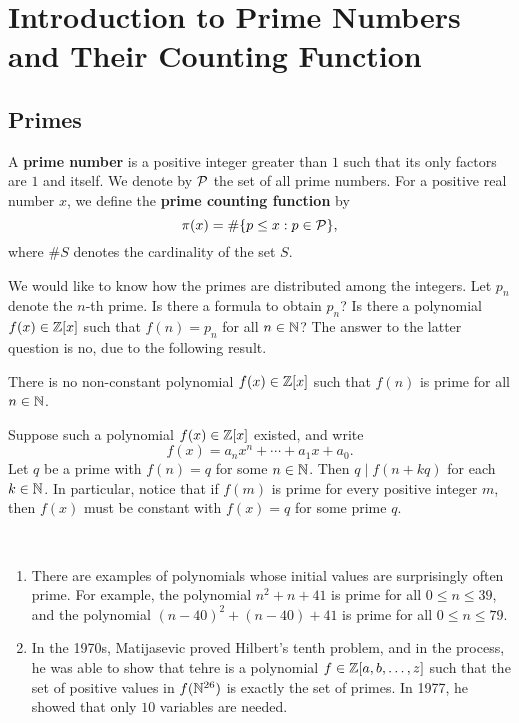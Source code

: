 \section{Introduction to Prime Numbers and Their Counting Function}\label{sec:1}

\subsection{Primes}\label{subsec:1.1}

\begin{defn}\label{def:1.1}
A {\bf prime number} is a positive integer greater than $1$ such that its only factors are $1$ and 
itself. We denote by ${\cal P}$ the set of all prime numbers. For a positive real number $x$, 
we define the {\bf prime counting function} by 
\[ \pi(x) = \#\{p \leq x : p \in {\cal P}\}, \]
where $\#S$ denotes the cardinality of the set $S$. 
\end{defn}

We would like to know how the primes are distributed among the integers. Let $p_n$ denote the 
$n$-th prime. Is there a formula to obtain $p_n$? Is there a polynomial $f(x) \in \mathbb{Z}[x]$ such that 
$f(n) = p_n$ for all $n \in \mathbb{N}$? The answer to the latter question is no, due to the following result. 

\begin{prop}\label{prop:1.2}
There is no non-constant polynomial $f(x) \in \mathbb{Z}[x]$ such that $f(n)$ is prime for all $n \in \mathbb{N}$. 
\end{prop}
\begin{pf}
Suppose such a polynomial $f(x) \in \mathbb{Z}[x]$ existed, and write 
\[ f(x) = a_n x^n + \cdots + a_1 x + a_0. \]
Let $q$ be a prime with $f(n) = q$ for some $n \in \mathbb{N}$. Then $q \mid f(n+kq)$ for each $k \in \mathbb{N}$. 
In particular, notice that if $f(m)$ is prime for every positive integer $m$, then $f(x)$ must be 
constant with $f(x) = q$ for some prime $q$. 
\end{pf}

\begin{remark}\label{remark:1.3}~
\begin{enumerate}[(1)]
    \item There are examples of polynomials whose initial values are surprisingly often prime. 
    For example, the polynomial $n^2 + n + 41$ is prime for all $0 \leq n \leq 39$, and the 
    polynomial $(n-40)^2 + (n-40) + 41$ is prime for all $0 \leq n \leq 79$. 
    \item In the 1970s, Matijasevic proved Hilbert's tenth problem, and in the process, he was able to
    show that tehre is a polynomial $f \in \mathbb{Z}[a, b, \dots, z]$ such that the set of positive 
    values in $f(\mathbb{N}^{26})$ is exactly the set of primes. In 1977, he showed that only $10$ variables 
    are needed.
\end{enumerate}
\end{remark}


